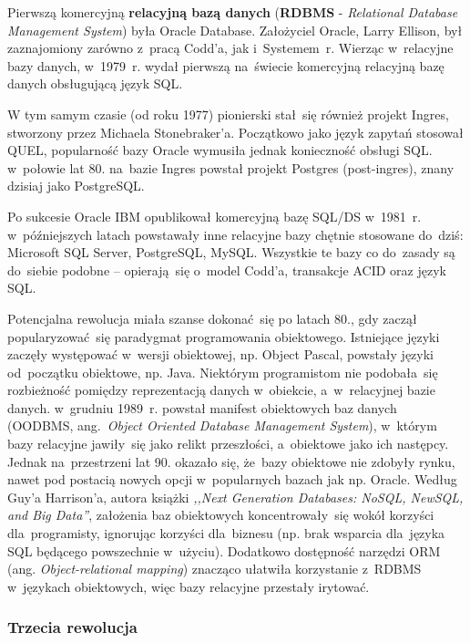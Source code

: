 \documentclass[12pt,a4paper,twoside,titlepage,openright]{book}
\begin{document}
Pierwszą komercyjną \textbf{relacyjną bazą danych} (\textbf{RDBMS} - \textit{Relational Database Management System}) była Oracle Database. Założyciel Oracle, Larry Ellison, był zaznajomiony zarówno z~pracą Codd'a, jak i~Systemem~r. Wierząc w~relacyjne bazy danych, w~1979~r. wydał pierwszą na~świecie komercyjną relacyjną bazę danych obsługującą język SQL. \cite{relationalDbs}

W tym samym czasie (od roku 1977) pionierski stał~się również projekt Ingres, stworzony przez Michaela Stonebraker'a. Początkowo jako język zapytań stosował QUEL, popularność bazy Oracle wymusiła jednak konieczność obsługi SQL. w~połowie lat 80. na~bazie Ingres powstał projekt Postgres (post-ingres), znany dzisiaj jako PostgreSQL. 

Po sukcesie Oracle IBM opublikował komercyjną bazę SQL/DS w~1981~r. w~późniejszych latach powstawały inne relacyjne bazy chętnie stosowane do~dziś: Microsoft SQL Server, PostgreSQL, MySQL. Wszystkie te bazy co do~zasady są do~siebie podobne -- opierają~się o~model Codd'a, transakcje ACID oraz język SQL. \cite{relationalDbs}

Potencjalna rewolucja miała szanse dokonać~się po latach 80., gdy zaczął popularyzować~się paradygmat programowania obiektowego. Istniejące języki zaczęły występować w~wersji obiektowej, np. Object Pascal, powstały języki od~początku obiektowe, np. Java. Niektórym programistom nie podobała~się rozbieżność pomiędzy reprezentacją danych w~obiekcie, a~w~relacyjnej bazie danych. w~grudniu 1989~r. powstał manifest obiektowych baz danych (OODBMS, ang.~\textit{Object Oriented Database Management System}), w~którym bazy relacyjne jawiły~się jako relikt przeszłości, a~obiektowe jako ich następcy.\cite{oodbmsManifesto} Jednak na~przestrzeni lat 90. okazało się, że~bazy obiektowe nie zdobyły rynku, nawet pod postacią nowych opcji w~popularnych bazach jak np. Oracle. Według Guy'a Harrison'a, autora książki \textit{,,Next Generation Databases: NoSQL, NewSQL, and Big Data''}, założenia baz obiektowych koncentrowały~się wokół korzyści dla~programisty, ignorując korzyści dla~biznesu (np. brak wsparcia dla~języka SQL będącego powszechnie w~użyciu). Dodatkowo dostępność narzędzi ORM (ang. \textit{Object-relational mapping}) znacząco ułatwiła korzystanie z~RDBMS w~językach obiektowych, więc bazy relacyjne przestały irytować.

\subsubsection{Trzecia rewolucja}
\end{document}
